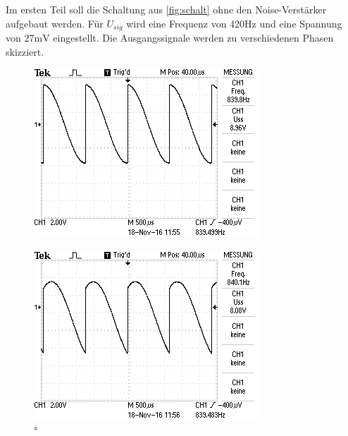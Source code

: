Im ersten Teil soll die Schaltung aus \ref{fig:schalt} ohne den Noise-Verstärker
aufgebaut werden. Für $U_{sig}$ wird eine Frequenz von 420$\si{\hertz}$ und eine
Spannung von $27\si{\milli\volt}$ eingestellt. Die Ausgangssignale werden zu
verschiedenen Phasen skizziert.
\begin{figure}[!h]
  \begin{minipage}[t]{0.3\textwidth}
    \includegraphics[width=\textwidth]{Bilder/15.jpeg}
    \label{fig:15}
    \caption{\si{\degree}}
  \end{minipage}
  \begin{minipage}[t]{0.3\textwidth}
    \includegraphics[width=\textwidth]{Bilder/45.jpeg}

\end{minipage}
\end{figure}
